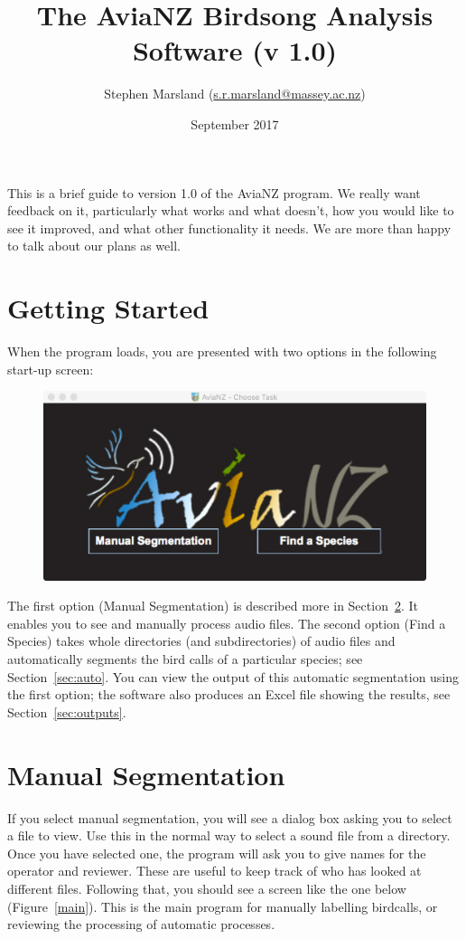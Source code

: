 \documentclass{article}
\title{The AviaNZ Birdsong Analysis Software (v 1.0)}
\author{Stephen Marsland (\url{s.r.marsland@massey.ac.nz})}
\date{September 2017}
\begin{document}
\maketitle



This is a brief guide to version 1.0 of the AviaNZ program. 
We really want feedback on it, particularly what works and what doesn't, how you would like to see it improved, and what other functionality it needs. We are more than happy to talk about our plans as well. 


\section{Getting Started}

When the program loads, you are presented with two options in the following start-up screen:

\begin{figure}[h!]
\centering
\includegraphics[width=.3\textwidth]{Figs/splashscreen}
\label{welcome}
\end{figure}

The first option (Manual Segmentation) is described more in Section~\ref{sec:manual}. It enables you to see and manually process audio files. The second option (Find a Species) takes whole directories (and subdirectories) of audio files and automatically segments the bird calls of a particular species; see Section~\ref{sec:auto}. You can view the output of this automatic segmentation using the first option; the software also produces an Excel file showing the results, see Section~\ref{sec:outputs}.  

\section{Manual Segmentation}
\label{sec:manual}

If you select manual segmentation, you will see a dialog box asking you to select a file to view. Use this in the normal way to select a sound file from a directory. Once you have selected one, the program will ask you to give names for the operator and reviewer. These are useful to keep track of who has looked at different files. Following that, you should see a screen like the one below (Figure~\ref{main}). This is the main program for manually labelling birdcalls, or reviewing the processing of automatic processes.
\end{document}
